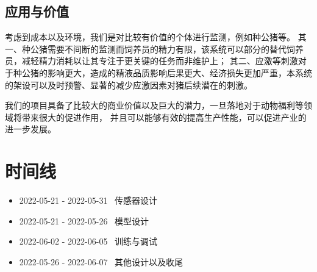 \documentclass[UTF8]{ctexart}
\begin{document}
\subsection{应用与价值}

考虑到成本以及环境，我们是对比较有价值的个体进行监测，例如种公猪等。
其一、种公猪需要不间断的监测而饲养员的精力有限，该系统可以部分的替代饲养员，减轻精力消耗以让其专注于更关键的任务而非维护上；
其二、应激等刺激对于种公猪的影响更大，造成的精液品质影响后果更大、经济损失更加严重，本系统的架设可以及时预警、显著的减少应激因素对猪后续潜在的刺激。
\par
我们的项目具备了比较大的商业价值以及巨大的潜力，一旦落地对于动物福利等领域将带来很大的促进作用，
并且可以能够有效的提高生产性能，可以促进产业的进一步发展。


{}


\newpage
\section{时间线}
\begin{itemize}
    \item 2022-05-21 - 2022-05-31 ~传感器设计
    \item 2022-05-21 - 2022-05-26 ~模型设计
    \item 2022-06-02 - 2022-06-05 ~训练与调试
    \item 2022-05-26 - 2022-06-07 ~其他设计以及收尾
\end{itemize}

\end{document}
